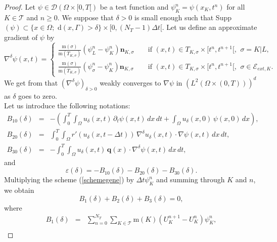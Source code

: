 \documentclass[smallextended]{svjour3}
\newcommand{\ds}{\displaystyle}
\def\pa{\partial}
\def\ud{u_{\delta}}
\def\pa{\partial}
\begin{document}
\begin{proof}
Let $\psi \in \mathcal{D}(\Omega \times [0,T[)$ be a test function and $\psi^{n}_{K}=\psi(x_{K},t^{n})$ for all $K \in \mathcal{T}$ and $n \geq 0$. We suppose that $\delta >0$ is small enough such that Supp$(\psi) \subset \lbrace x \in \Omega; \text{ d}(x,\Gamma)>\delta \rbrace \times [0,(N_{T}-1)\Delta t[$. Let us define an approximate gradient of $\psi$ by
\begin{equation*}
\nabla^{\delta}\psi(x,t)=\left\{\begin{array}{lcl} \ds{\frac{\text{m}(\sigma)}{\text{m}(T_{K,\sigma})}\left(\psi^{n}_{L}-\psi^{n}_{K}\right) \mathbf{n}_{K,\sigma}} &  & \text{ if }  (x,t) \in T_{K,\sigma}\times [t^{n},t^{n+1}[,\,\ \sigma=K|L, \\ \ds{\frac{\text{m}(\sigma)}{\text{m}(T_{K,\sigma})}\left(\psi_{\sigma}^{n}-\psi^{n}_{K}\right) \mathbf{n}_{K,\sigma}} & & \text{ if }  (x,t) \in T_{K,\sigma}\times [t^{n},t^{n+1}[, \,\ \sigma \in \mathcal{E}_{ext,K}. \end{array}\right.
\end{equation*}
We get from \cite{Eymard2003} that $(\nabla^{\delta}\psi)_{\delta>0}$ weakly converges to $\nabla \psi$ in $(L^{2}(\Omega \times (0,T)))^{d}$ as $\delta$ goes to zero.\\
Let us introduce the following notations:
\begin{eqnarray*}
B_{10}(\delta) &=& -\left(\int_{0}^{T}\int_{\Omega}\ud(x,t)\,\pa_{t}\psi(x,t)\, dx \, dt+\int_{\Omega}\ud(x,0)\, \psi(x,0) \, dx\right),\\
B_{20}(\delta) &=& \int_{0}^{T}\int_{\Omega}r'(u_{\delta}(x,t-\Delta t))\, \nabla^{\delta}u_{\delta}(x,t)\cdot \nabla\psi(x,t)\, dx \, dt,\\
B_{30}(\delta) &=& -\int_{0}^{T}\int_{\Omega} \ud(x,t)\, \mathbf{q}(x) \cdot \nabla^{\delta}\psi(x,t)\, dx \, dt,
\end{eqnarray*}
and
\begin{equation*}
\varepsilon(\delta)=-B_{10}(\delta)-B_{20}(\delta)-B_{30}(\delta).
\end{equation*}
Multiplying the scheme (\ref{schemegene}) by $\Delta t \psi^{n}_{K}$ and summing through $K$ and $n$, we obtain
\begin{equation*}
B_{1}(\delta)+B_{2}(\delta)+B_{3}(\delta)=0,
\end{equation*}
where
\begin{eqnarray*}
B_{1}(\delta) &=& \sum_{n=0}^{N_{T}}\sum_{K \in \mathcal{T}}\text{m}(K)\left(U_{K}^{n+1}-U_{K}^{n}\right)\psi^{n}_{K},\\

\end{eqnarray*}
\end{proof}
\end{document}
